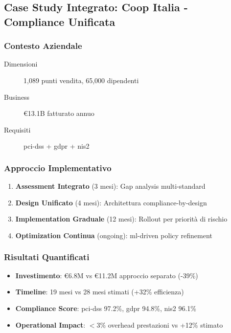 \subsection{Case Study Integrato: Coop Italia - Compliance Unificata}
\label{subsec:case-study-coop-italia}

\subsubsection{Contesto Aziendale}

\begin{description}
    \item[Dimensioni] 1,089 punti vendita, 65,000 dipendenti
    \item[Business] €13.1B fatturato annuo
    \item[Requisiti] \gls{pci-dss} + \gls{gdpr} + \gls{nis2}
\end{description}

\subsubsection{Approccio Implementativo}

\begin{enumerate}
    \item \textbf{Assessment Integrato} (3 mesi): Gap analysis multi-standard
    \item \textbf{Design Unificato} (4 mesi): Architettura compliance-by-design
    \item \textbf{Implementation Graduale} (12 mesi): Rollout per priorità di rischio
    \item \textbf{Optimization Continua} (ongoing): \gls{ml}-driven policy refinement
\end{enumerate}

\subsubsection{Risultati Quantificati}

\begin{itemize}
    \item \textbf{Investimento}: €6.8M vs €11.2M approccio separato (-39\%)
    \item \textbf{Timeline}: 19 mesi vs 28 mesi stimati (+32\% efficienza)
    \item \textbf{Compliance Score}: \gls{pci-dss} 97.2\%, \gls{gdpr} 94.8\%, \gls{nis2} 96.1\%
    \item \textbf{Operational Impact}: $<3$\% overhead prestazioni vs +12\% stimato
\end{itemize}

